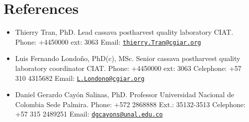 \documentclass[11pt,a4paper,]{awesome-cv}
\begin{document}
\hypertarget{references}{%
\section{References}\label{references}}

\begin{itemize}
\item
  Thierry Tran, PhD. Lead cassava postharvest quality laboratory CIAT.
  Phone: +4450000 ext: 3063 Email:
  \href{mailto:thierry.Tran@cgiar.org}{\nolinkurl{thierry.Tran@cgiar.org}}
\item
  Luis Fernando Londoño, PhD(c), MSc. Senior cassava postharvest quality
  laboratory coordinator CIAT. Phone: +4450000 ext: 3063 Celephone: +57
  310 4315682 Email:
  \href{mailto:L.Londono@cgiar.org}{\nolinkurl{L.Londono@cgiar.org}}
\item
  Daniel Gerardo Cayón Salinas, PhD. Professor Universidad Nacional de
  Colombia Sede Palmira. Phone: +572 2868888 Ext.: 35132-3513 Celephone:
  +57 315 2489251 Email:
  \href{mailto:dgcayons@unal.edu.co}{\nolinkurl{dgcayons@unal.edu.co}}
\end{itemize}


\label{LastPage}~
\end{document}
